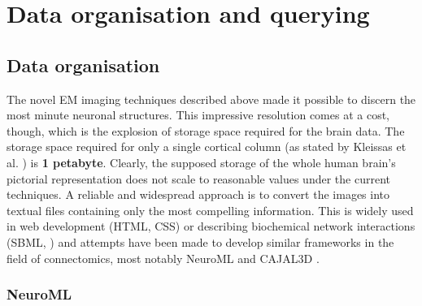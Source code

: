 \documentclass[a4paper, 11pt]{article}
\numberwithin{equation}{section}
\begin{document}
	
		\newpage
		
		\clearpage
			
		\pagestyle{wojciech}
		
		\section{Data organisation and querying}
		
		\subsection{Data organisation}
		The novel EM imaging techniques described above made it possible to discern the most minute neuronal structures. This impressive resolution comes at a cost, though, which is the explosion of storage space required for the brain data. The storage space required for only a single cortical column (as stated by Kleissas et al. \cite{kleissaslarge}) is \textbf{1 petabyte}. Clearly, the supposed storage of the whole human brain's pictorial representation does not scale to reasonable values under the current techniques. A reliable and widespread approach is to convert the images into textual files containing only the most compelling information. This is widely used in web development (HTML, CSS) or describing biochemical network interactions (SBML, \cite{hucka2003systems}) and attempts have been made to develop similar frameworks in the field of connectomics, most notably NeuroML \cite{gleeson2010neuroml}  and CAJAL3D \cite{kleissaslarge}.
		
		\subsubsection{NeuroML}
		
\end{document}
